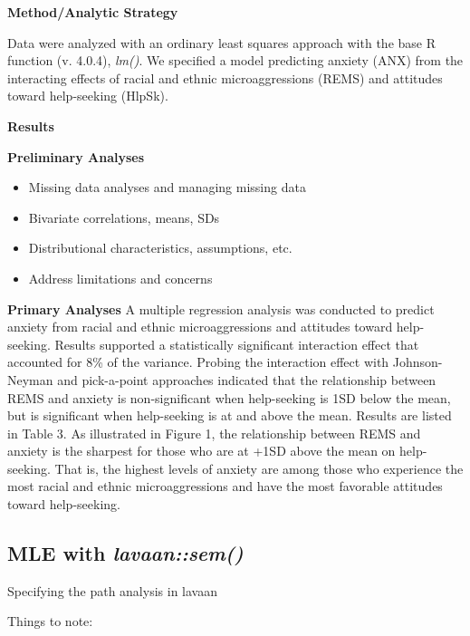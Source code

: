 \documentclass[
  11pt,
]{book}
\providecommand{\tightlist}{%
  \setlength{\itemsep}{0pt}\setlength{\parskip}{0pt}}
\begin{document}
\textbf{Method/Analytic Strategy}

Data were analyzed with an ordinary least squares approach with the base R function (v. 4.0.4), \emph{lm()}. We specified a model predicting anxiety (ANX) from the interacting effects of racial and ethnic microaggressions (REMS) and attitudes toward help-seeking (HlpSk).

\textbf{Results}

\textbf{Preliminary Analyses}

\begin{itemize}
\tightlist
\item
  Missing data analyses and managing missing data
\item
  Bivariate correlations, means, SDs
\item
  Distributional characteristics, assumptions, etc.
\item
  Address limitations and concerns
\end{itemize}

\textbf{Primary Analyses} A multiple regression analysis was conducted to predict anxiety from racial and ethnic microaggressions and attitudes toward help-seeking. Results supported a statistically significant interaction effect that accounted for 8\% of the variance. Probing the interaction effect with Johnson-Neyman and pick-a-point approaches indicated that the relationship between REMS and anxiety is non-significant when help-seeking is 1SD below the mean, but is significant when help-seeking is at and above the mean. Results are listed in Table 3. As illustrated in Figure 1, the relationship between REMS and anxiety is the sharpest for those who are at +1SD above the mean on help-seeking. That is, the highest levels of anxiety are among those who experience the most racial and ethnic microaggressions and have the most favorable attitudes toward help-seeking.

\hypertarget{mle-with-lavaansem}{%
\subsection{\texorpdfstring{MLE with \emph{lavaan::sem()}}{MLE with lavaan::sem()}}\label{mle-with-lavaansem}}

Specifying the path analysis in lavaan

Things to note:
\end{document}

